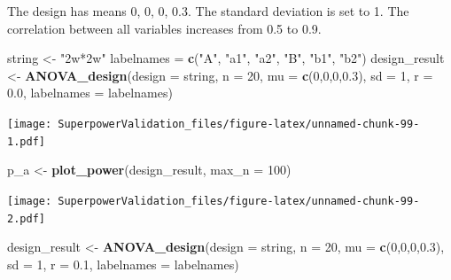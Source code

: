 \documentclass[]{book}
\newenvironment{Shaded}{\begin{snugshade}}{\end{snugshade}}
\newcommand{\DataTypeTok}[1]{\textcolor[rgb]{0.13,0.29,0.53}{#1}}
\newcommand{\DecValTok}[1]{\textcolor[rgb]{0.00,0.00,0.81}{#1}}
\newcommand{\FloatTok}[1]{\textcolor[rgb]{0.00,0.00,0.81}{#1}}
\newcommand{\KeywordTok}[1]{\textcolor[rgb]{0.13,0.29,0.53}{\textbf{#1}}}
\newcommand{\NormalTok}[1]{#1}
\newcommand{\StringTok}[1]{\textcolor[rgb]{0.31,0.60,0.02}{#1}}
\begin{document}
The design has means 0, 0, 0, 0.3. The standard deviation is set to 1. The correlation between all variables increases from 0.5 to 0.9.

\begin{Shaded}
\begin{Highlighting}[]
\NormalTok{string <-}\StringTok{ "2w*2w"}
\NormalTok{labelnames =}\StringTok{ }\KeywordTok{c}\NormalTok{(}\StringTok{"A"}\NormalTok{, }\StringTok{"a1"}\NormalTok{, }\StringTok{"a2"}\NormalTok{, }\StringTok{"B"}\NormalTok{, }\StringTok{"b1"}\NormalTok{, }\StringTok{"b2"}\NormalTok{)}
\NormalTok{design_result <-}\StringTok{ }\KeywordTok{ANOVA_design}\NormalTok{(}\DataTypeTok{design =}\NormalTok{ string,}
                              \DataTypeTok{n =} \DecValTok{20}\NormalTok{, }
                              \DataTypeTok{mu =} \KeywordTok{c}\NormalTok{(}\DecValTok{0}\NormalTok{,}\DecValTok{0}\NormalTok{,}\DecValTok{0}\NormalTok{,}\FloatTok{0.3}\NormalTok{), }
                              \DataTypeTok{sd =} \DecValTok{1}\NormalTok{, }
                              \DataTypeTok{r =} \FloatTok{0.0}\NormalTok{, }
                              \DataTypeTok{labelnames =}\NormalTok{ labelnames)}
\end{Highlighting}
\end{Shaded}

\texttt{[image: SuperpowerValidation\_files/figure-latex/unnamed-chunk-99-1.pdf]}

\begin{Shaded}
\begin{Highlighting}[]
\NormalTok{p_a <-}\StringTok{ }\KeywordTok{plot_power}\NormalTok{(design_result,}
                      \DataTypeTok{max_n =} \DecValTok{100}\NormalTok{)}
\end{Highlighting}
\end{Shaded}

\texttt{[image: SuperpowerValidation\_files/figure-latex/unnamed-chunk-99-2.pdf]}

\begin{Shaded}
\begin{Highlighting}[]
\NormalTok{design_result <-}\StringTok{ }\KeywordTok{ANOVA_design}\NormalTok{(}\DataTypeTok{design =}\NormalTok{ string,}
                              \DataTypeTok{n =} \DecValTok{20}\NormalTok{, }
                              \DataTypeTok{mu =} \KeywordTok{c}\NormalTok{(}\DecValTok{0}\NormalTok{,}\DecValTok{0}\NormalTok{,}\DecValTok{0}\NormalTok{,}\FloatTok{0.3}\NormalTok{), }
                              \DataTypeTok{sd =} \DecValTok{1}\NormalTok{, }
                              \DataTypeTok{r =} \FloatTok{0.1}\NormalTok{, }
                              \DataTypeTok{labelnames =}\NormalTok{ labelnames)}
\end{Highlighting}
\end{Shaded}
\end{document}
